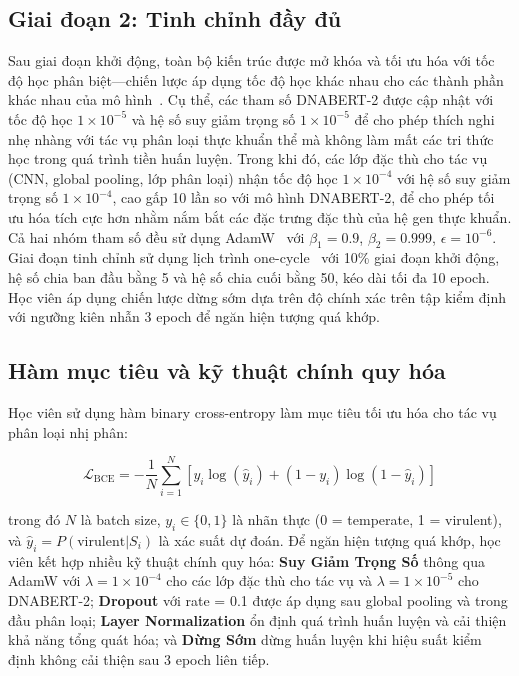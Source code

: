 \subsection{Giai đoạn 2: Tinh chỉnh đầy đủ}

Sau giai đoạn khởi động, toàn bộ kiến trúc được mở khóa và tối ưu hóa với tốc độ học phân biệt—chiến lược áp dụng tốc độ học khác nhau cho các thành phần khác nhau của mô hình~\cite{howard2018universal}. Cụ thể, các tham số DNABERT-2 được cập nhật với tốc độ học $1 \times 10^{-5}$ và hệ số suy giảm trọng số $1 \times 10^{-5}$ để cho phép thích nghi nhẹ nhàng với tác vụ phân loại thực khuẩn thể mà không làm mất các tri thức học trong quá trình tiền huấn luyện. Trong khi đó, các lớp đặc thù cho tác vụ (CNN, global pooling, lớp phân loại) nhận tốc độ học $1 \times 10^{-4}$ với hệ số suy giảm trọng số $1 \times 10^{-4}$, cao gấp 10 lần so với mô hình DNABERT-2, để cho phép tối ưu hóa tích cực hơn nhằm nắm bắt các đặc trưng đặc thù của hệ gen thực khuẩn. Cả hai nhóm tham số đều sử dụng AdamW~\cite{loshchilov2017decoupled} với $\beta_1 = 0.9$, $\beta_2 = 0.999$, $\epsilon = 10^{-6}$. Giai đoạn tinh chỉnh sử dụng lịch trình one-cycle~\cite{smith2019super} với 10\% giai đoạn khởi động, hệ số chia ban đầu bằng 5 và hệ số chia cuối bằng 50, kéo dài tối đa 10 epoch. Học viên áp dụng chiến lược dừng sớm dựa trên độ chính xác trên tập kiểm định với ngưỡng kiên nhẫn 3 epoch để ngăn hiện tượng quá khớp.

\subsection{Hàm mục tiêu và kỹ thuật chính quy hóa}

Học viên sử dụng hàm binary cross-entropy làm mục tiêu tối ưu hóa cho tác vụ phân loại nhị phân:

\begin{equation}
    \mathcal{L}_{\text{BCE}} = -\frac{1}{N} \sum_{i=1}^{N} \left[ y_i \log(\hat{y}_i) + (1 - y_i) \log(1 - \hat{y}_i) \right]
    \label{eq:bce_loss}
\end{equation}

trong đó $N$ là batch size, $y_i \in \{0, 1\}$ là nhãn thực (0 = temperate, 1 = virulent), và $\hat{y}_i = P(\text{virulent} | S_i)$ là xác suất dự đoán. Để ngăn hiện tượng quá khớp, học viên kết hợp nhiều kỹ thuật chính quy hóa: \textbf{Suy Giảm Trọng Số} thông qua AdamW với $\lambda = 1 \times 10^{-4}$ cho các lớp đặc thù cho tác vụ và $\lambda = 1 \times 10^{-5}$ cho DNABERT-2; \textbf{Dropout} với rate = 0.1 được áp dụng sau global pooling và trong đầu phân loại; \textbf{Layer Normalization} ổn định quá trình huấn luyện và cải thiện khả năng tổng quát hóa; và \textbf{Dừng Sớm} dừng huấn luyện khi hiệu suất kiểm định không cải thiện sau 3 epoch liên tiếp.

